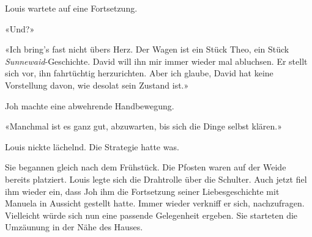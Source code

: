 Louis wartete auf eine Fortsetzung.

«Und?»

«Ich bring’s fast nicht übers Herz. Der Wagen ist ein Stück Theo, ein
Stück \emph{Sunnewaid}-Geschichte. David will ihn mir immer wieder mal
abluchsen. Er stellt sich vor, ihn fahrtüchtig herzurichten. Aber ich
glaube, David hat keine Vorstellung davon, wie desolat sein Zustand
ist.»

Joh machte eine abwehrende Handbewegung.

«Manchmal ist es ganz gut, abzuwarten, bis sich die Dinge selbst
klären.»

Louis nickte lächelnd. Die Strategie hatte was.

\sectionbreak

Sie begannen gleich nach dem Frühstück. Die Pfosten waren auf der Weide
bereits platziert. Louis legte sich die Drahtrolle über die Schulter.
Auch jetzt fiel ihm wieder ein, dass Joh ihm die Fortsetzung seiner
Liebesgeschichte mit Manuela in Aussicht gestellt hatte. Immer wieder
verkniff er sich, nachzufragen. Vielleicht würde sich nun eine passende
Gelegenheit ergeben.
Sie starteten die Umzäunung in der Nähe des Hauses.
